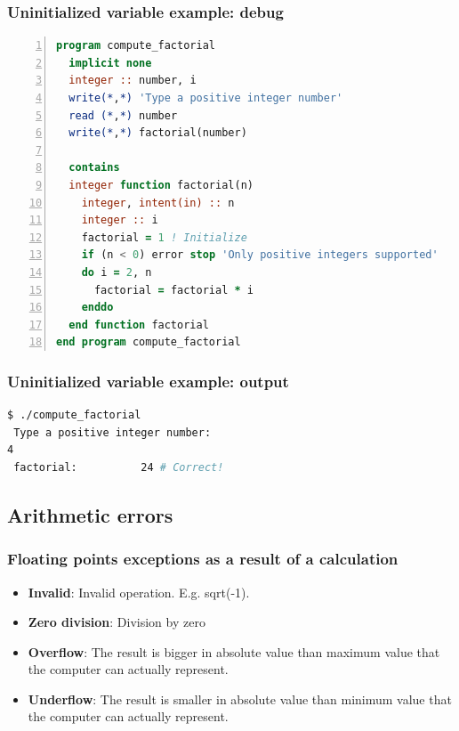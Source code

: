 \documentclass[t]{myBeamer}
\begin{document}
\begin{frame}[fragile,t]
\frametitle{ Uninitialized variable example: debug }
\vspace{-10pt}
\begin{lstlisting}[language=fortran,numbers=left]
program compute_factorial
  implicit none 
  integer :: number, i
  write(*,*) 'Type a positive integer number'
  read (*,*) number
  write(*,*) factorial(number)

  contains
  integer function factorial(n)
	integer, intent(in) :: n
	integer :: i
	factorial = 1 ! Initialize
	if (n < 0) error stop 'Only positive integers supported'
	do i = 2, n
	  factorial = factorial * i 
	enddo
  end function factorial
end program compute_factorial
\end{lstlisting}

\end{frame}


\begin{frame}[fragile,t]
\frametitle{ Uninitialized variable example: output }
\vspace{-10pt}
\begin{lstlisting}[language=bash]
$ ./compute_factorial 
 Type a positive integer number:
4
 factorial:          24 # Correct!
\end{lstlisting}

\end{frame}


\subsection{Arithmetic errors}
\begin{frame}[t]
\frametitle{Floating points exceptions as a result of a calculation}
\Large
\centering
  \begin{itemize}
   \item \textbf{Invalid}: Invalid operation. E.g. sqrt(-1).
   \item \textbf{Zero division}: Division by zero
   \item \textbf{Overflow}: The result is bigger in absolute value than maximum value that the computer can actually represent.
   \item \textbf{Underflow}: The result is smaller in absolute value than minimum value that the computer can actually represent.
  \end{itemize}
\end{frame}
\end{document}
